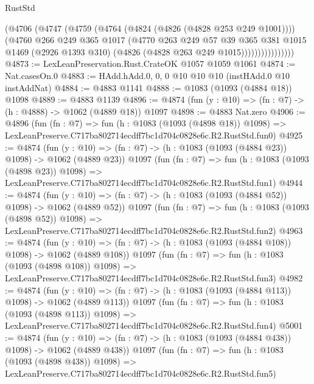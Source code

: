 \begin{lexlean}{RustStd}
\begin{coremodule}
                      (@4706
                        (@4747
                          (@4759
                            (@4764 (@4824 (@4826 (@4828 @253 @249 @1001))))
                            (@4760
                              @266
                              @249
                              @365
                              @1017
                              (@4770
                                @263
                                @249
                                @57
                                @39
                                @365
                                @381
                                @1015
                                @1469
                                (@2926 @1393 @310)
                                (@4826 (@4828 @263 @249 @1015))))))))))))))))
@4873 := LexLeanPreservation.Rust.CrateOK @1057 @1059 @1061
@4874 := Nat.casesOn.{0}
@4883 := HAdd.hAdd.{0, 0, 0} @10 @10 @10 (instHAdd.{0} @10 instAddNat)
@4884 := @4883 @1141
@4888 := @1083 (@1093 (@4884 @18)) @1098
@4889 := @4883 @1139
@4896 := @4874 (fun (y : @10) => (fn : @7) -> (h : @4888) -> @1062 (@4889 @18)) @1097
@4898 := @4883 Nat.zero
@4906 := @4896
    (fun (fn : @7) =>
    fun (h : @1083 (@1093 (@4898 @18)) @1098) =>
    LexLeanPreserve.C717ba802714ecdff7bc1d704c0828e6c.R2.RustStd.fun0)
@4925 := @4874
    (fun (y : @10) => (fn : @7) -> (h : @1083 (@1093 (@4884 @23)) @1098) -> @1062 (@4889 @23))
    @1097
    (fun (fn : @7) =>
    fun (h : @1083 (@1093 (@4898 @23)) @1098) =>
    LexLeanPreserve.C717ba802714ecdff7bc1d704c0828e6c.R2.RustStd.fun1)
@4944 := @4874
    (fun (y : @10) => (fn : @7) -> (h : @1083 (@1093 (@4884 @52)) @1098) -> @1062 (@4889 @52))
    @1097
    (fun (fn : @7) =>
    fun (h : @1083 (@1093 (@4898 @52)) @1098) =>
    LexLeanPreserve.C717ba802714ecdff7bc1d704c0828e6c.R2.RustStd.fun2)
@4963 := @4874
    (fun (y : @10) => (fn : @7) -> (h : @1083 (@1093 (@4884 @108)) @1098) -> @1062 (@4889 @108))
    @1097
    (fun (fn : @7) =>
    fun (h : @1083 (@1093 (@4898 @108)) @1098) =>
    LexLeanPreserve.C717ba802714ecdff7bc1d704c0828e6c.R2.RustStd.fun3)
@4982 := @4874
    (fun (y : @10) => (fn : @7) -> (h : @1083 (@1093 (@4884 @113)) @1098) -> @1062 (@4889 @113))
    @1097
    (fun (fn : @7) =>
    fun (h : @1083 (@1093 (@4898 @113)) @1098) =>
    LexLeanPreserve.C717ba802714ecdff7bc1d704c0828e6c.R2.RustStd.fun4)
@5001 := @4874
    (fun (y : @10) => (fn : @7) -> (h : @1083 (@1093 (@4884 @438)) @1098) -> @1062 (@4889 @438))
    @1097
    (fun (fn : @7) =>
    fun (h : @1083 (@1093 (@4898 @438)) @1098) =>
    LexLeanPreserve.C717ba802714ecdff7bc1d704c0828e6c.R2.RustStd.fun5)

\end{coremodule}
\end{lexlean}
